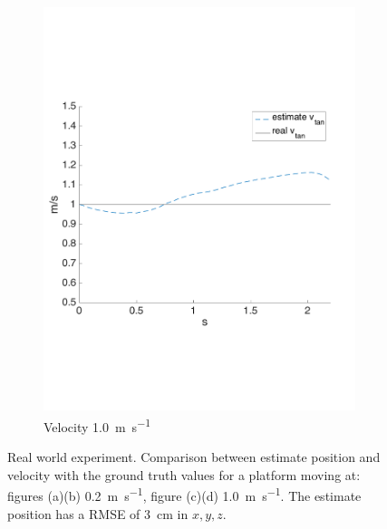 \begin{figure}[!htbp]
\begin{subfigure}[b]{0.45\textwidth}
        \includegraphics[width=\textwidth]{img/tag_moving_real_world_vel2.pdf}
        \caption{Velocity  \SI{1.0}{\meter \per \second}}
        \label{fig:two_ekf_real_world_moving2}
   \end{subfigure}
  \caption{Real world experiment. Comparison between estimate position and velocity with the ground truth values for a platform moving at: figures (a)(b) \SI{0.2}{\meter \per \second}, figure (c)(d) \SI{1.0}{\meter \per \second}. The estimate position has a RMSE of \SI{3}{\centi \meter} in $x,y,z$.}
  \label{fig:ekf_real_world_moving}
\end{figure} 

